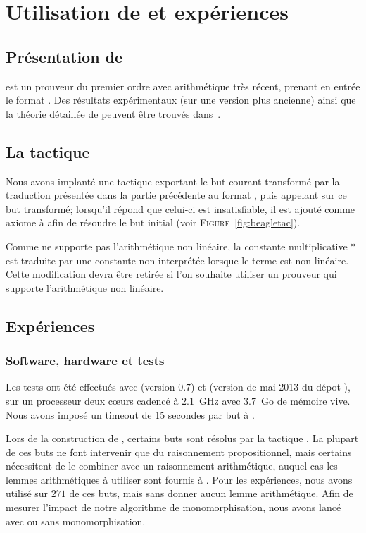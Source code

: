 \section{Utilisation de \beagle et expériences}
\label{sec:experiences}

\subsection{Présentation de \beagle}
\beagle est un prouveur du premier ordre avec arithmétique très récent,
prenant en entrée le format \tff. Des résultats expérimentaux (sur une
version plus ancienne) ainsi que la théorie détaillée de \beagle peuvent être trouvés dans~\cite{DBLP:conf/cade/BaumgartnerW13}.


\subsection{La tactique \beagletac}
\label{sec:experiences:beagletac}

Nous avons implanté une tactique \beagletac exportant le but courant
transformé par la traduction présentée dans la partie précédente au
format \tff, puis appelant \beagle sur ce but transformé; lorsqu'il
répond que celui-ci est insatisfiable, il est ajouté comme axiome à
\holfour afin de résoudre le but initial (voir
\textsc{Figure}~\ref{fig:beagletac}).

Comme \beagle ne supporte pas l'arithmétique non linéaire, la constante
multiplicative $*$ est traduite par une constante non interprétée
lorsque le terme est non-linéaire. Cette modification devra être retirée
si l'on souhaite utiliser un prouveur qui supporte l'arithmétique non
linéaire.


\subsection{Expériences}
\label{sec:experiences:experiences}

\subsubsection{Software, hardware et tests}
Les tests ont été effectués avec \beagle (version $0.7$) et \holfour
(version de mai 2013 du dépot ), sur un processeur deux cœurs cadencé à $2.1$~GHz avec $3.7$~Go de mémoire vive.
Nous avons imposé un timeout de 15 secondes par but à \beagle.

Lors de la construction de \holfour, certains buts sont résolus par la
tactique \metistac. La plupart de ces buts ne font intervenir que du
raisonnement propositionnel, mais certains nécessitent de le combiner
avec un raisonnement arithmétique, auquel cas les lemmes arithmétiques à
utiliser sont fournis à \metistac. Pour les expériences, nous avons
utilisé \beagletac sur $271$ de ces buts, mais sans donner aucun lemme
arithmétique. Afin de mesurer l'impact de notre algorithme de
monomorphisation, nous avons lancé \beagletac avec ou sans
monomorphisation.

